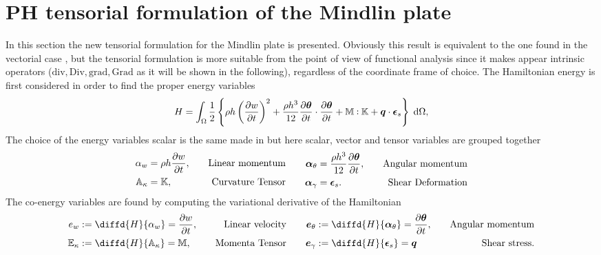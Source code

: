 \documentclass[preprint,12pt]{elsarticle}
\newcommand{\RevOne}[1]{\textcolor{blue!80!black}{#1}}
\def\onedot{$\mathsurround0pt\ldotp$}
\def\cddot{%
	\mathbin{\vcenter{\baselineskip.67ex
			\hbox{\onedot}\hbox{\onedot}}%
}}
\begin{document}
\section{PH tensorial formulation of the Mindlin plate}
\label{sec:PH_ten_Min}
In this section the new tensorial formulation for the Mindlin plate is presented. \RevOne{Obviously this result is equivalent to the one found in the vectorial case \cite{MacchelliMindlin}, but the tensorial formulation is more suitable from the point of view of functional analysis since it makes appear intrinsic operators ($\mathrm{div}, \mathrm{Div}, \mathrm{grad}, \mathrm{Grad}$ as it will be shown in the following), regardless of the coordinate frame of choice. \newline
The Hamiltonian energy is first considered in order to find the proper energy variables
\begin{equation}
\label{eq:H_min}
H = \int_{\Omega} \frac{1}{2} \left\{ \rho h \left(\diffp{w}{t} \right)^2 + \frac{\rho h^3}{12} \diffp{\bm{\theta}}{t} \cdot   \diffp{\bm{\theta}}{t} +   \mathbb{M} \cddot \mathbb{K} + \bm{q} \cdot \bm{\epsilon}_s  \right\}  \d\Omega, 
\end{equation}
The choice of the energy variables scalar is the same made in \cite{MacchelliMindlin} but here scalar,}  vector and tensor variables are grouped together
\begin{equation}
\begin{aligned}
\alpha_w &= \rho h \diffp{w}{t}, \quad &\text{Linear momentum} \\
\mathbb{A}_{\kappa} &= \mathbb{K}, \quad &\text{Curvature Tensor} \\
\end{aligned} \qquad
\begin{aligned}
\bm\alpha_{\theta} &=  \frac{\rho h^3}{12} \diffp{\bm{\theta}}{t}, \quad &\text{Angular momentum}\\
\bm\alpha_{\gamma} &= \bm{\epsilon}_s. \quad &\text{Shear Deformation}\\
\end{aligned}
\end{equation}
The co-energy variables are found by computing the variational derivative of the Hamiltonian
\begin{equation}
\begin{aligned}
e_w &:= \diffd{H}{\alpha_w} = \diffp{w}{t},  \quad &\text{Linear velocity} \\
\mathbb{E}_{\kappa} &:= \diffd{H}{\mathbb{A}_{\kappa}} = \mathbb{M}, \quad &\text{Momenta Tensor}\\
\end{aligned} \qquad
\begin{aligned}
\bm{e}_{\theta} &:= \diffd{H}{\bm\alpha_{\theta}} = \diffp{\bm{\theta}}{t}, \quad &\text{Angular momentum}  \\
\bm{e}_{\gamma} &:= \diffd{H}{\bm{\epsilon}_s} = \bm{q} \quad &\text{Shear stress}. \\
\end{aligned}
\end{equation}
\end{document}
